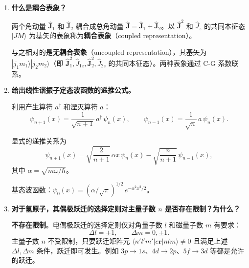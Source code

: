 \begin{enumerate}[label=\textbf{\arabic*.}, leftmargin=2em, itemsep=0.8em, resume]
\textbf{$n=2$ 能级}（四重简并：$2s, 2p_0, 2p_{+1}, 2p_{-1}$）发生\textbf{一级（线性）斯塔克效应}：
\begin{itemize}[nosep]
    \item 在简并子空间中，$\hat{H}'$ 的矩阵元仅 $ \langle 2s|z|2p_0\rangle$ 和 $ \langle 2p_0|z|2s\rangle$ 非零；
    \item 对角化后，$2s$ 与 $2p_0$ 耦合成两个新态，能级分裂为
    \[
        \Delta E = \pm 3e\mathcal{E}a_0,
    \]
    其中 $a_0$ 为玻尔半径；
    \item $2p_{\pm 1}$ 态在一级微扰下能量不变（仍为 $E_2$）。
\end{itemize}

\textbf{基态 $n=1$}：只有 $1s$ 态，$\langle 1s|z|1s\rangle = 0$（球对称），故\textbf{无一级斯塔克效应}，只有二级（二次）效应 $\Delta E \propto \mathcal{E}^2$。

\item \textbf{什么是耦合表象？}

两个角动量 $\hat{\mathbf{J}}_1$ 和 $\hat{\mathbf{J}}_2$ 耦合成总角动量 $\hat{\mathbf{J}} = \hat{\mathbf{J}}_1 + \hat{\mathbf{J}}_2$。以 $\hat{\mathbf{J}}^2$ 和 $\hat{J}_z$ 的共同本征态 $|JM\rangle$ 为基矢的表象称为\textbf{耦合表象}（coupled representation）。

与之相对的是\textbf{无耦合表象}（uncoupled representation），其基矢为 $|j_1m_1\rangle|j_2m_2\rangle$（即 $\hat{\mathbf{J}}_1^2, \hat{J}_{1z}, \hat{\mathbf{J}}_2^2, \hat{J}_{2z}$ 的共同本征态）。两种表象通过 C-G 系数联系。

\item \textbf{给出线性谐振子定态波函数的递推公式。}

利用产生算符 $a^\dagger$ 和湮灭算符 $a$：
\[
    \psi_{n+1}(x) = \frac{1}{\sqrt{n+1}}\,a^\dagger\,\psi_n(x),\qquad
    \psi_{n-1}(x) = \frac{1}{\sqrt{n}}\,a\,\psi_n(x).
\]

显式的递推关系为
\[
    \psi_{n+1}(x) = \sqrt{\frac{2}{n+1}}\,\alpha x\,\psi_n(x) - \sqrt{\frac{n}{n+1}}\,\psi_{n-1}(x),
\]
其中 $\alpha = \sqrt{m\omega/\hbar}$。

基态波函数：$\psi_0(x) = (\alpha/\sqrt{\pi})^{1/2}\,e^{-\alpha^2x^2/2}$。

\item \textbf{对于氢原子，其偶极跃迁的选择定则对主量子数 $n$ 是否存在限制？为什么？}

\textbf{不存在限制}。电偶极跃迁的选择定则仅对角量子数 $l$ 和磁量子数 $m$ 有要求：
\[
    \Delta l = \pm 1, \qquad \Delta m = 0, \pm 1.
\]
主量子数 $n$ 不受限制，只要跃迁矩阵元 $\langle n'l'm'|e\mathbf{r}|nlm\rangle \neq 0$ 且满足上述 $\Delta l, \Delta m$ 条件，跃迁即可发生。例如 $3p\to 1s$、$4d\to 2p$、$5f\to 3d$ 等都是允许的跃迁。


\end{enumerate}
